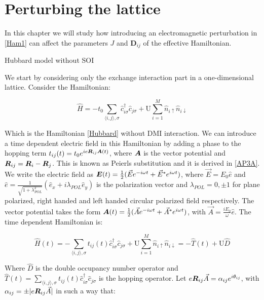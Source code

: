 \chapter{Perturbing the lattice}

In this chapter we will study how introducing an electromagnetic perturbation in \ref{Ham1} can affect the parameters $J$ and $\boldsymbol{D}_{ij}$ of the effective Hamiltonian. 

\begin{section}{Hubbard model without SOI}

We start by considering only the exchange interaction part in a one-dimensional lattice. Consider the Hamiltonian:

\begin{equation}
\hat{H} = -t_0\sum_{\langle i,j \rangle, \sigma} \hat{c}_{i \sigma}^\dagger \hat{c}_{j \sigma} + \text{U} \sum_{i=1}^M \hat{n}_{i\uparrow}\hat{n}_{i\downarrow}
\end{equation}

Which is the Hamiltonian \ref{Hubbard} without DMI interaction. We can introduce a time dependent electric field in this Hamiltonian by adding a phase to the hopping term $t_{ij}(t) = t_0e^{ie\boldsymbol{R}_{ij}\boldsymbol{A}(t)}$, where $\boldsymbol{A}$ is the vector potential and $\boldsymbol{R}_{ij} = \boldsymbol{R}_i-\boldsymbol{R}_j$. This is known as Peierls substitution and it is derived in \ref{AP3A}. We write the electric field as $\boldsymbol{E}(t) = \frac{1}{2}(\vec{E}e^{-i\omega t}+\vec{E}^*e^{i\omega t})$, where $\vec{E} = E_0\hat{e}$ and $\hat{e} = \frac{1}{\sqrt{1+\lambda_{POL}^2}}(\hat{e}_x+i\lambda_{POL}\hat{e}_y)$ is the polarization vector and $\lambda_{POL} = 0, \pm 1$ for plane polarized, right handed and left handed circular polarized field respectively. The vector potential takes the form $\boldsymbol{A}(t) = \frac{1}{2}(\vec{A}e^{-i\omega t} + \vec{A}^* e^{i\omega t})$, with $\vec{A} = \frac{iE_0}{\omega}\hat{e}$. The time dependent Hamiltonian is:

\begin{equation}
\hat{H}(t) = -\sum_{\langle i,j \rangle, \sigma} t_{ij}(t)\hat{c}_{i \sigma}^\dagger \hat{c}_{j \sigma} + \text{U} \sum_{i=1}^M \hat{n}_{i\uparrow}\hat{n}_{i\downarrow} = -\hat{T}(t) + \text{U}\hat{D}
\end{equation}

Where $\hat{D}$ is the double occupancy number operator and $\hat{T}(t) = \sum_{\langle i,j \rangle, \sigma} t_{ij}(t)\hat{c}_{i \sigma}^\dagger \hat{c}_{j \sigma}$ is the hopping operator. Let $e\boldsymbol{R}_{ij}\vec{A} = \alpha_{ij} e^{i \theta_{ij}}$, with $\alpha_{ij} = \pm|e\boldsymbol{R}_{ij}\vec{A}|$ in such a way that:


\end{section}
